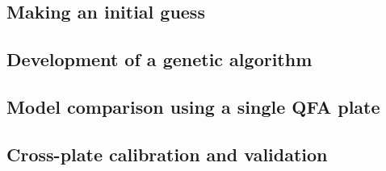 
\subsection{\thesubsection~Making an initial guess}
\subsection{\thesubsection~Development of a genetic algorithm}
\subsection{\thesubsection~Model comparison using a single QFA plate}
\subsection{\thesubsection~Cross-plate calibration and validation}
